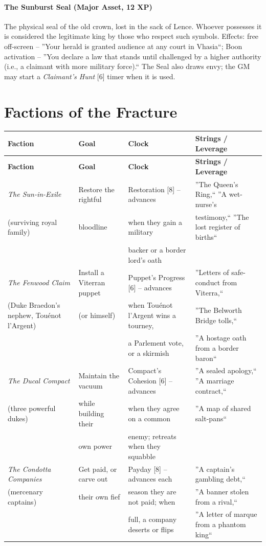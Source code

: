 \documentclass[11pt,twoside]{book}
\begin{document}
\paragraph{The Sunburst Seal (Major Asset, 12 XP)}
The physical seal of the old crown, lost in the sack of Lence. Whoever possesses it is considered the legitimate king by those who respect such symbols. Effects: free off-screen -- ''Your herald is granted audience at any court in Vhasia``; Boon activation -- ''You declare a law that stands until challenged by a higher authority (i.e., a claimant with more military force).`` The Seal also draws envy; the GM may start a \textit{Claimant's Hunt} [6] timer when it is used.

\section*{Factions of the Fracture}

\begin{longtable}{|p{}|p{}|p{}|p{}|}
\hline
\textbf{Faction} & \textbf{Goal} & \textbf{Clock} & \textbf{Strings / Leverage} \\
\hline
\endfirsthead
\hline
\textbf{Faction} & \textbf{Goal} & \textbf{Clock} & \textbf{Strings / Leverage} \\
\hline
\textit{The Sun-in-Exile} & Restore the rightful & Restoration [8] -- advances & ''The Queen's Ring,`` ''A wet-nurse's \\
(surviving royal family) & bloodline & when they gain a military & testimony,`` ''The lost register of births`` \\
& & backer or a border lord's oath & \\
\hline
\textit{The Fenwood Claim} & Install a Viterran puppet & Puppet's Progress [6] -- advances & ''Letters of safe-conduct from Viterra,`` \\
(Duke Braedon's nephew, Touénot l'Argent) & (or himself) & when Touénot l'Argent wins a tourney, & ''The Belworth Bridge tolls,`` \\
& & a Parlement vote, or a skirmish & ''A hostage oath from a border baron`` \\
\hline
\textit{The Ducal Compact} & Maintain the vacuum & Compact's Cohesion [6] -- advances & ''A sealed apology,`` ''A marriage contract,`` \\
(three powerful dukes) & while building their & when they agree on a common & ''A map of shared salt-pans`` \\
& own power & enemy; retreats when they squabble & \\
\hline
\textit{The Condotta Companies} & Get paid, or carve out & Payday [8] -- advances each & ''A captain's gambling debt,`` \\
(mercenary captains) & their own fief & season they are not paid; when & ''A banner stolen from a rival,`` \\
& & full, a company deserts or flips & ''A letter of marque from a phantom king`` \\
\hline
\end{longtable}
\end{document}
